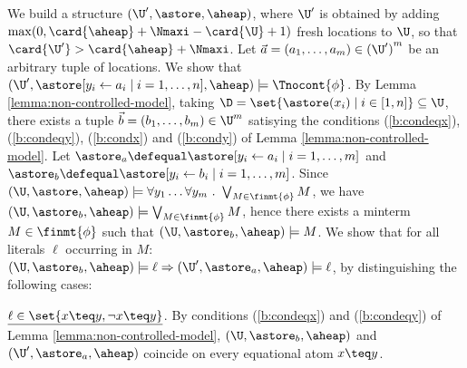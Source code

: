 We build a structure $(\U',\astore,\aheap)$, where $\U'$ is obtained
by adding $\max(0, \card{\aheap}+\Nmaxi-\card{\U}+1)$ fresh locations
to $\U$, so that $\card{\U'} > \card{\aheap}+\Nmaxi$. Let $\vec{a} =
(a_1,\dots,a_m) \in {(\U')}^m$ be an arbitrary tuple of locations. We
show that $(\U',\astore[y_i \leftarrow a_i \mid i=1,\ldots,n], \aheap)
\models \Tnocont{\phi}$. By Lemma \ref{lemma:non-controlled-model},
taking $\D = \set{\astore(x_i) \mid i \in [1,n]} \subseteq \U$, there
exists a tuple $\vec{b} = (b_1,\ldots,b_m) \in \U^m$ satisying the
conditions (\ref{b:condeqx}), (\ref{b:condeqy}), (\ref{b:condx}) and
(\ref{b:condy}) of Lemma \ref{lemma:non-controlled-model}. Let
$\astore_a \defequal \astore[y_i \leftarrow a_i \mid i=1,\ldots,m]$
and $\astore_b \defequal \astore[y_i \leftarrow b_i \mid
  i=1,\ldots,m]$. Since $(\U,\astore,\aheap) \models \forall y_1
\ldots \forall y_m ~.~\bigvee_{M \in \finmt{\phi}} M$, we have
$(\U,\astore_b,\aheap) \models \bigvee_{M \in \finmt{\phi}} M$, hence
there exists a minterm $M \in \finmt{\phi}$ such that
$(\U,\astore_b,\aheap) \models M$. We show that for all literals
$\ell$ occurring in $M$: $(\U,\astore_b,\aheap) \models \ell
\Rightarrow (\U',\astore_a,\aheap) \models \ell$, by distinguishing
the following cases:

\noindent
$\underline{\ell \in \set{x \teq y, \neg x \teq y}}$. By conditions
(\ref{b:condeqx}) and (\ref{b:condeqy}) of Lemma
\ref{lemma:non-controlled-model}, $(\U,\astore_b,\aheap)$ and
$(\U',\astore_a,\aheap)$ coincide on every equational atom $x \teq y$.

